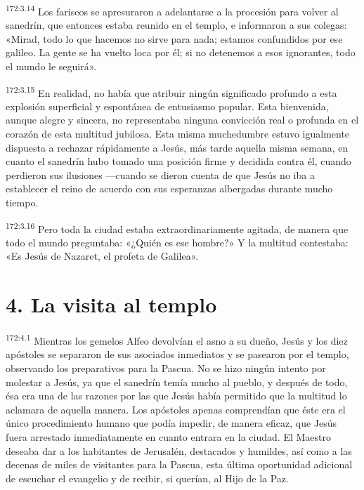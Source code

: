 \par 
\textsuperscript{172:3.14} Los fariseos se apresuraron a adelantarse a la procesión para volver al sanedrín, que entonces estaba reunido en el templo, e informaron a sus colegas: «Mirad, todo lo que hacemos no sirve para nada; estamos confundidos por ese galileo. La gente se ha vuelto loca por él; si no detenemos a esos ignorantes, todo el mundo le seguirá».

\par 
\textsuperscript{172:3.15} En realidad, no había que atribuir ningún significado profundo a esta explosión superficial y espontánea de entusiasmo popular. Esta bienvenida, aunque alegre y sincera, no representaba ninguna convicción real o profunda en el corazón de esta multitud jubilosa. Esta misma muchedumbre estuvo igualmente dispuesta a rechazar rápidamente a Jesús, más tarde aquella misma semana, en cuanto el sanedrín hubo tomado una posición firme y decidida contra él, cuando perdieron sus ilusiones ---cuando se dieron cuenta de que Jesús no iba a establecer el reino de acuerdo con sus esperanzas albergadas durante mucho tiempo.

\par 
\textsuperscript{172:3.16} Pero toda la ciudad estaba extraordinariamente agitada, de manera que todo el mundo preguntaba: «¿Quién es ese hombre?» Y la multitud contestaba: «Es Jesús de Nazaret, el profeta de Galilea».

\section*{4. La visita al templo}
\par 
\textsuperscript{172:4.1} Mientras los gemelos Alfeo devolvían el asno a su dueño, Jesús y los diez apóstoles se separaron de sus asociados inmediatos y se pasearon por el templo, observando los preparativos para la Pascua. No se hizo ningún intento por molestar a Jesús, ya que el sanedrín temía mucho al pueblo, y después de todo, ésa era una de las razones por las que Jesús había permitido que la multitud lo aclamara de aquella manera. Los apóstoles apenas comprendían que éste era el único procedimiento humano que podía impedir, de manera eficaz, que Jesús fuera arrestado inmediatamente en cuanto entrara en la ciudad. El Maestro deseaba dar a los habitantes de Jerusalén, destacados y humildes, así como a las decenas de miles de visitantes para la Pascua, esta última oportunidad adicional de escuchar el evangelio y de recibir, si querían, al Hijo de la Paz.

